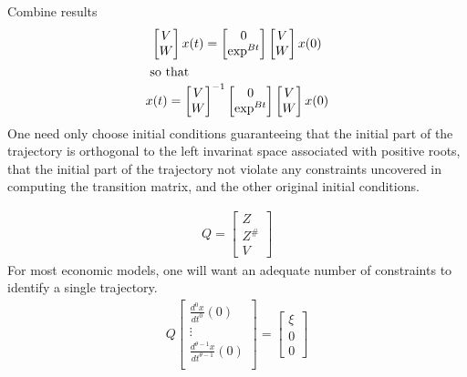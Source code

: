 \documentclass[1p]{elsarticle}
\begin{document}
Combine results
\begin{gather*}
  \begin{bmatrix}
    V\\W
  \end{bmatrix}x(t) = 
  \begin{bmatrix}
    0\\ \exp^{B t}
  \end{bmatrix}\begin{bmatrix}
    V\\W
  \end{bmatrix} x(0) \\ \intertext{ so that }
x(t)=\begin{bmatrix}
    V\\W
  \end{bmatrix}^{-1}  \begin{bmatrix}
    0\\ \exp^{B t}
  \end{bmatrix} \begin{bmatrix}
    V\\W
  \end{bmatrix}x(0) 
\end{gather*}
One need only choose initial conditions guaranteeing that the initial part of
the trajectory is orthogonal to the left invarinat space associated with 
positive roots, that the initial part of the trajectory not violate any constraints
uncovered in computing the transition matrix, and the other original
initial conditions.

\begin{gather*}
Q=  \begin{bmatrix}
    Z\\Z^\#\\V
  \end{bmatrix}
\end{gather*}
For most economic models, one  will want
an adequate number of constraints to identify a single trajectory.
\begin{gather*}
  Q 
  \begin{bmatrix}
    \frac{d^0x}{dt^0}(0)\\
\vdots\\
    \frac{d^{\theta-1}x}{dt^{\theta-1}}(0)\\
  \end{bmatrix}= 
  \begin{bmatrix}
\xi\\0\\0    
  \end{bmatrix}
\end{gather*}
\end{document}
